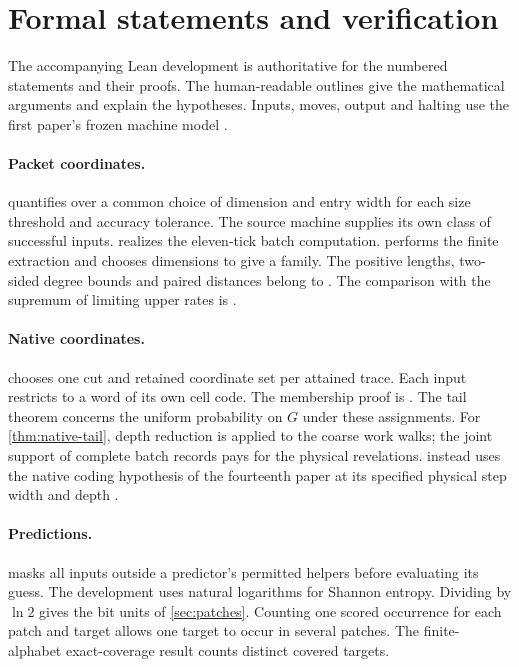 \section{Formal statements and verification}\label{sec:verification}

The accompanying Lean development is authoritative for the numbered
statements and their proofs. The human-readable outlines give the
mathematical arguments and explain the hypotheses. Inputs, moves, output
and halting use the first paper's frozen machine model \cite{PaperOne}.

\paragraph{Packet coordinates.}
 quantifies over a common
choice of dimension and entry width for each size threshold and accuracy
tolerance. The source machine supplies its own class of successful inputs.
 realizes the eleven-tick
batch computation. 
performs the finite extraction and
 chooses
dimensions to give a family. The positive lengths, two-sided degree
bounds and paired distances belong to
. The comparison with the
supremum of limiting upper rates is
.

\paragraph{Native coordinates.}
 chooses one cut and
retained coordinate set per attained trace. Each input restricts to a
word of its own cell code. The membership proof is
. The tail theorem concerns the uniform
probability on $G$ under these assignments. For \cref{thm:native-tail},
depth reduction is applied to the coarse work walks; the joint support
of complete batch records pays for the physical revelations.
 instead uses the native coding hypothesis of the
fourteenth paper at its specified physical step width and depth
\cite[Corollary~L]{PaperFourteen}.

\paragraph{Predictions.}
 masks all inputs outside
a predictor's permitted helpers before evaluating its guess.
The development uses natural logarithms for Shannon entropy. Dividing
by $\ln 2$ gives the bit units of \cref{sec:patches}. Counting one scored
occurrence for each patch and target allows one target to occur in
several patches. The finite-alphabet exact-coverage result counts
distinct covered targets.

